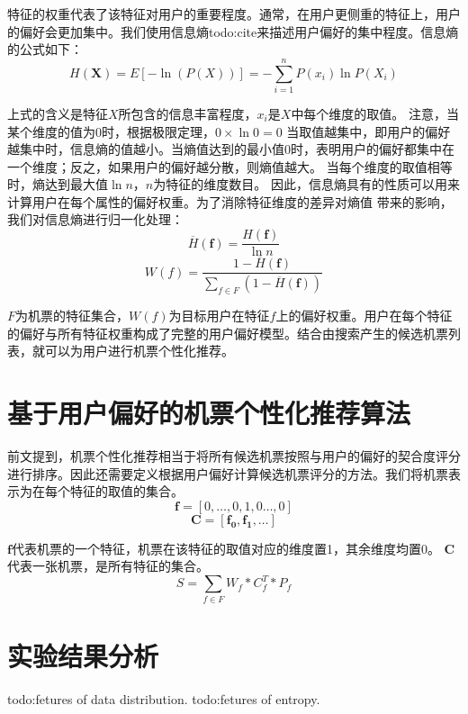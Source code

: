 特征的权重代表了该特征对用户的重要程度。通常，在用户更侧重的特征上，用户的偏好会更加集中。我们使用信息熵todo:cite来描述用户偏好的集中程度。信息熵的公式如下：
\begin{equation}
	H(\mathbf{X}) = E[-\ln (P(X))] = - \sum_{i=1}^n P(x_i)\ln P(X_i)
\end{equation}\par

上式的含义是特征$X$所包含的信息丰富程度，$x_i$是$X$中每个维度的取值。
注意，当某个维度的值为$0$时，根据极限定理，$0 \times \ln 0 = 0$
当取值越集中，即用户的偏好越集中时，信息熵的值越小。当熵值达到的最小值$0$时，表明用户的偏好都集中在一个维度；反之，如果用户的偏好越分散，则熵值越大。
当每个维度的取值相等时，熵达到最大值$\ln n$，$n$为特征的维度数目。
因此，信息熵具有的性质可以用来计算用户在每个属性的偏好权重。为了消除特征维度的差异对熵值
带来的影响，我们对信息熵进行归一化处理：
\begin{equation}
  \overline{H}(\mathbf{f}) = \frac{H(\mathbf{f})}{\ln n}
\end{equation}
\begin{equation}
  W(f) = \frac{1 - \overline{H}(\mathbf{f})}{\sum_{f \in F}(1 - \overline{H}(\mathbf{f}))}
\end{equation}\par
$F$为机票的特征集合，$W(f)$为目标用户在特征$f$上的偏好权重。用户在每个特征的偏好与所有特征权重构成了完整的用户偏好模型。结合由搜索产生的候选机票列表，就可以为用户进行机票个性化推荐。

\section{基于用户偏好的机票个性化推荐算法}

前文提到，机票个性化推荐相当于将所有候选机票按照与用户的偏好的契合度评分进行排序。因此还需要定义根据用户偏好计算候选机票评分的方法。我们将机票表示为在每个特征的取值的集合。
\begin{equation}
  \mathbf{f} = [0,\dots,0,1,0\dots,0]
\end{equation}
\begin{equation}
  \mathbf{C} = [\mathbf{f_0},\mathbf{f_1},\dots]
\end{equation}\par
$\mathbf{f}$代表机票的一个特征，机票在该特征的取值对应的维度置1，其余维度均置0。 $\mathbf{C}$代表一张机票，是所有特征的集合。
\begin{equation}
  S = \sum_{f \in F}W_f*C_f^T*P_f
\end{equation}

\section{实验结果分析}

todo:fetures of data distribution.
todo:fetures of entropy.